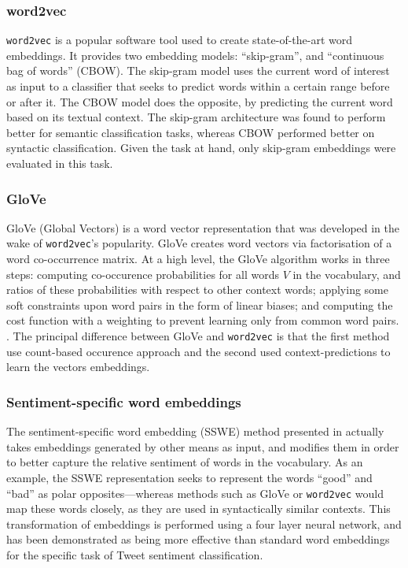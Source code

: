 \subsubsection{word2vec}
\texttt{word2vec} is a popular software tool used to create state-of-the-art word embeddings. \cite{mikolov2013distributed} It provides two embedding models: ``skip-gram'', and ``continuous bag of words'' (CBOW). The skip-gram model uses the current word of interest as input to a classifier that seeks to predict words within a certain range before or after it. The CBOW model does the opposite, by predicting the current word based on its textual context. The skip-gram architecture was found to perform better for semantic classification tasks, whereas CBOW performed better on syntactic classification. \cite{mikolov2013efficient} Given the task at hand, only skip-gram embeddings were evaluated in this task.

\subsubsection{GloVe}
GloVe (Global Vectors) is a word vector representation that was developed in the wake of \texttt{word2vec}'s popularity. GloVe creates word vectors via factorisation of a word co-occurrence matrix. At a high level, the GloVe algorithm works in three steps: computing co-occurence probabilities for all words $V$ in the vocabulary, and ratios of these probabilities with respect to other context words; applying some soft constraints upon word pairs in the form of linear biases; and computing the cost function with a weighting to prevent learning only from common word pairs. \cite{pennington2014glove}. The principal difference between GloVe and \texttt{word2vec} is that the first method use count-based occurence approach and the second used context-predictions to learn the vectors embeddings. 

\subsubsection{Sentiment-specific word embeddings}
The sentiment-specific word embedding (SSWE) method presented in \cite{tang2014learning} actually takes embeddings generated by other means as input, and modifies them in order to better capture the relative sentiment of words in the vocabulary. As an example, the SSWE representation seeks to represent the words ``good'' and ``bad'' as polar opposites---whereas methods such as GloVe or \texttt{word2vec} would map these words closely, as they are used in syntactically similar contexts. This transformation of embeddings is performed using a four layer neural network, and has been demonstrated as being more effective than standard word embeddings for the specific task of Tweet sentiment classification. 


